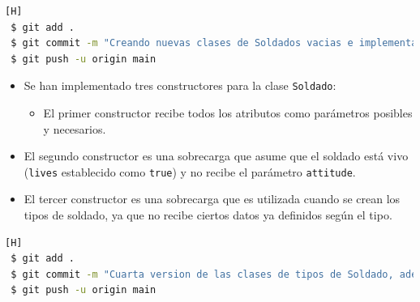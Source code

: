 \documentclass{article}
\begin{document}
\begin{lstlisting}[language=bash,caption={Commit \href{https://github.com/hernanchoquehuanca/fp2-23b/commit/bb6e2c8ae317d84675ff2d4305baad296aea1cd3}{bb6e2c8}: Agregando los atributos solicitados a la clase Soldado y a las clases derivadas de la misma}][H]
 $ git add .
 $ git commit -m "Creando nuevas clases de Soldados vacias e implementando la clase Mapa.java"			
 $ git push -u origin main
\end{lstlisting}


\begin{itemize}
    \item Se han implementado tres constructores para la clase \texttt{Soldado}:
    \begin{itemize}
        \item El primer constructor recibe todos los atributos como parámetros posibles y necesarios.
    \end{itemize}
\end{itemize}



\begin{itemize}
    \begin{itemize}
        \item El segundo constructor es una sobrecarga que asume que el soldado está vivo (\texttt{lives} establecido como \texttt{true}) y no recibe el parámetro \texttt{attitude}.
    \end{itemize}
\end{itemize}


\begin{itemize}
    \begin{itemize}
        \item El tercer constructor es una sobrecarga que es utilizada cuando se crean los tipos de soldado, ya que no recibe ciertos datos ya definidos según el tipo.
    \end{itemize}
\end{itemize}


\begin{lstlisting}[language=bash,caption={Commit \href{https://github.com/hernanchoquehuanca/fp2-23b/commit/bb6e2c8ae317d84675ff2d4305baad296aea1cd3}{bb6e2c8}: Se agregó el constructor para recibir datos de los tipos de soldado, excepto los ya definidos}][H]
 $ git add .
 $ git commit -m "Cuarta version de las clases de tipos de Soldado, ademas de modificar la clase principal (VideoJuego7.java)"			
 $ git push -u origin main
\end{lstlisting}
\end{document}
